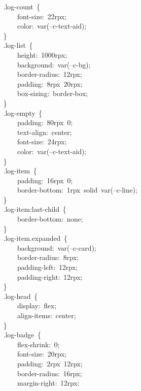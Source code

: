 \documentclass[a4paper,10pt]{article}
\begin{document}
{\ttfamily\footnotesize\raggedright
~~~~.log-count~\{\\
~~~~~~~~font-size:~22rpx;\\
~~~~~~~~color:~var(--c-text-aid);\\
~~~~\}\\
~~~~.log-list~\{\\
~~~~~~~~height:~1000rpx;\\
~~~~~~~~background:~var(--c-bg);\\
~~~~~~~~border-radius:~12rpx;\\
~~~~~~~~padding:~8rpx~20rpx;\\
~~~~~~~~box-sizing:~border-box;\\
~~~~\}\\
~~~~.log-empty~\{\\
~~~~~~~~padding:~80rpx~0;\\
~~~~~~~~text-align:~center;\\
~~~~~~~~font-size:~24rpx;\\
~~~~~~~~color:~var(--c-text-aid);\\
~~~~\}\\
~~~~.log-item~\{\\
~~~~~~~~padding:~16rpx~0;\\
~~~~~~~~border-bottom:~1rpx~solid~var(--c-line);\\
~~~~\}\\
~~~~.log-item:last-child~\{\\
~~~~~~~~border-bottom:~none;\\
~~~~\}\\
~~~~.log-item.expanded~\{\\
~~~~~~~~background:~var(--c-card);\\
~~~~~~~~border-radius:~8rpx;\\
~~~~~~~~padding-left:~12rpx;\\
~~~~~~~~padding-right:~12rpx;\\
~~~~\}\\
~~~~.log-head~\{\\
~~~~~~~~display:~flex;\\
~~~~~~~~align-items:~center;\\
~~~~\}\\
~~~~.log-badge~\{\\
~~~~~~~~flex-shrink:~0;\\
~~~~~~~~font-size:~20rpx;\\
~~~~~~~~padding:~2rpx~12rpx;\\
~~~~~~~~border-radius:~16rpx;\\
~~~~~~~~margin-right:~12rpx;\\
}
\end{document}
